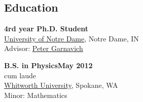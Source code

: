 \documentclass[margin]{res}
\begin{document}
\begin{resume}
\section{Education}

{\bf 4rd year Ph.D. Student}\\%
\href{http://physics.nd.edu}{University of Notre Dame}, Notre Dame, IN \\ 
Advisor: \href{www.nd.edu/~pgarnavi}{Peter Garnavich}


{\bf B.S. in Physics\hfill  May 2012 }\\
cum laude\\%
\href{http://www.whitworth.edu/physics/}{Whitworth University}, Spokane, WA \\ 
Minor: Mathematics
 






\end{resume}
\end{document}
